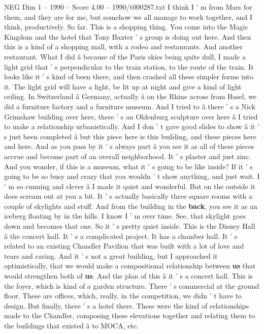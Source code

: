 \begin{textsample}{NEG Dim 1 – 1990 – Score 4.00 – 1990/t000287.txt}
I think I ' m from Mars for them, and they are for me, but somehow we all manage to work together, and I think, productively.
So far.
This is a shopping thing.
You come into the Magic Kingdom and the hotel that Tony Baxter ' s group is doing out here.
And then this is a kind of a shopping mall, with a rodeo and restaurants.
And another restaurant.
What I did â because of the Paris skies being quite dull, I made a light grid that ' s perpendicular to the train station, to the route of the train.
It looks like it ' s kind of been there, and then crashed all these simpler forms into it.
The light grid will have a light, be lit up at night and give a kind of light ceiling.
In Switzerland â Germany, actually â on the Rhine across from Basel, we did a furniture factory and a furniture museum.
And I tried to â there ' s a Nick Grimshaw building over here, there ' s an Oldenburg sculpture over here â I tried to make a relationship urbanistically.
And I don ' t gave good slides to show â it ' s just been completed â but this piece here is this building, and these pieces here and here.
And as you pass by it ' s always part â you see it as all of these pieces accrue and become part of an overall neighborhood.
It ' s plaster and just zinc.
And you wonder, if this is a museum, what it ' s going to be like inside?
If it ' s going to be so busy and crazy that you wouldn ' t show anything, and just wait.
I ' m so cunning and clever â I made it quiet and wonderful.
But on the outside it does scream out at you a bit.
It ' s actually basically three square rooms with a couple of skylights and stuff.
And from the building in the \textbf{back}, you see it as an iceberg floating by in the hills.
I know I ' m over time.
See, that skylight goes down and becomes that one.
So it ' s pretty quiet inside.
This is the Disney Hall â the concert hall.
It ' s a complicated project.
It has a chamber hall.
It ' s related to an existing Chandler Pavilion that was built with a lot of love and tears and caring.
And it ' s not a great building, but I approached it optimistically, that we would make a compositional relationship between \textbf{us} that would strengthen both of \textbf{us}.
And the plan of this â it ' s a concert hall.
This is the foyer, which is kind of a garden structure.
There ' s commercial at the ground floor.
These are offices, which, really, in the competition, we didn ' t have to design.
But finally, there ' s a hotel there.
These were the kind of relationships made to the Chandler, composing these elevations together and relating them to the buildings that existed â to MOCA, etc.

\end{textsample}
